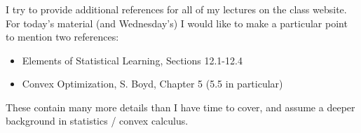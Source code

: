 \documentclass[xetex,mathserif,serif,aspectratio=169]{beamer}
\begin{document}
\begin{frame}[fragile] \frametitle{} \oldB \small

\textbf{}

I try to provide additional references for all of my lectures
on the class website. For today's material (and Wednesday's)
I would like to make a particular point to mention two references:
\begin{itemize}
\item Elements of Statistical Learning, Sections 12.1-12.4
\item Convex Optimization, S. Boyd, Chapter 5 (5.5 in particular)
\end{itemize}
These contain many more details than I have time to cover,
and assume a deeper background in statistics / convex calculus.

\end{frame}
\end{document}
